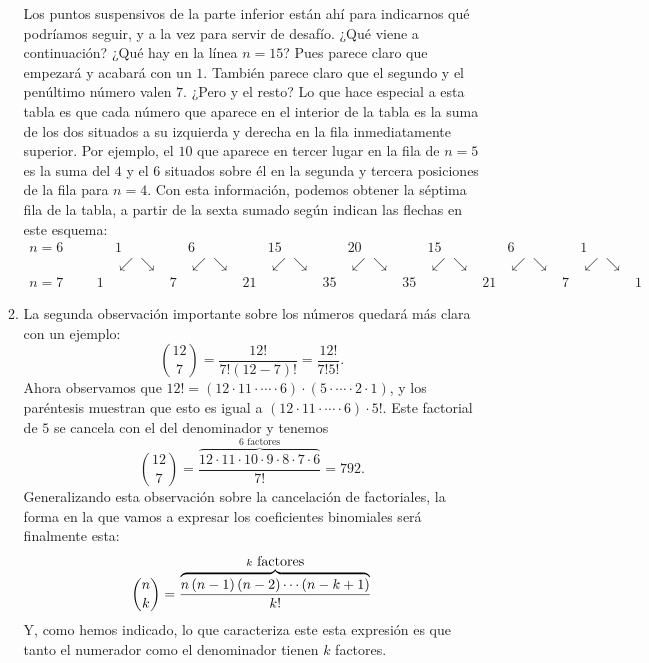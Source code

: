 \begin{itemize}
\begin{enumerate}
        Los puntos suspensivos de la parte inferior están ahí para indicarnos qué podríamos seguir, y a la vez para servir de desafío. ¿Qué viene a continuación? ¿Qué hay en la línea $n=15$? Pues parece claro que empezará y acabará con un $1$. También parece claro que el segundo y el penúltimo  número valen $7$. ¿Pero y el resto? Lo que hace especial a esta tabla es que {\sf cada número que aparece en el interior de la tabla es la suma de los dos situados a su izquierda y derecha en la fila inmediatamente superior.} Por ejemplo, el $10$ que aparece en tercer lugar en la fila de $n=5$  es la suma del $4$ y el $6$ situados sobre él en la  segunda y tercera posiciones de la fila para $n=4$. Con esta información, podemos         obtener la séptima fila de la tabla, a partir de la sexta sumado según indican las flechas en este esquema:
        \[
        \begin{array}{l|llcccccccccccccccc}
        n=6&&&&1&&6&&15&&20&&15&&6&&1\\
           &&&&\swarrow\searrow&&\swarrow\searrow&&\swarrow\searrow&&\swarrow\searrow&&\swarrow\searrow&&
           \swarrow\searrow&&\swarrow\searrow\\
        n=7&&&1&&7&&21&&35&&35&&21&&7&&1
        \end{array}
        \]
        \item La segunda observación importante sobre los números quedará más clara con un ejemplo:
        \[
        \binom{12}{7}=\dfrac{12!}{7!(12-7)!}=\dfrac{12!}{7!5!}.
        \]
        Ahora observamos que $12!=(12\cdot 11\cdot\cdots\cdot 6)\cdot(5\cdot\cdots\cdot 2\cdot 1)$, y los paréntesis muestran que esto
        es igual a $(12\cdot 11\cdot\cdots\cdot 6)\cdot 5!$. Este factorial de $5$ se cancela con el del denominador y tenemos
        \[
        \binom{12}{7}=\dfrac{\overbrace{12\cdot 11\cdot 10\cdot 9\cdot 8\cdot 7\cdot 6}^{6\mbox{ factores}}}{7!}=792.
        \]
        Generalizando esta observación sobre la cancelación de factoriales, la forma en la que vamos a expresar los coeficientes binomiales será finalmente esta:
        \begin{equation}\label{cap03:ecu:expresionPseudoFactorialCoeficientesBinomiales}
        \dbinom{n}{k}=\frac{\overbrace{n\left( n-1\right) \left( n-2\right) \cdots \left( n-k+1\right) }^{k\mbox{ factores}}}{k!}
        \end{equation}
        Y, como hemos indicado, lo que caracteriza este esta expresión es que tanto el numerador como el denominador tienen $k$ factores.
    \end{enumerate}


\end{itemize}
